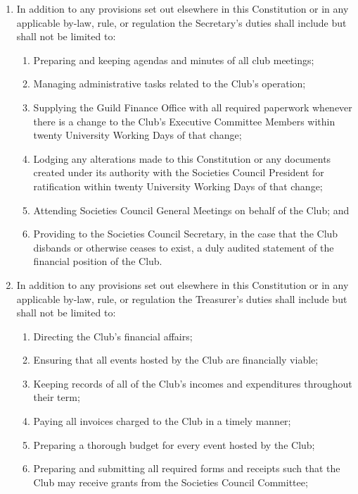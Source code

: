 \documentclass[12pt]{article}
\begin{document}
\begin{enumerate}[label=9.\arabic*]
\begin{enumerate}[label=\theenumi.\arabic*]
    \end{enumerate}
    \item In addition to any provisions set out elsewhere in this Constitution or in any applicable by-law, rule, or regulation the Secretary's duties shall include but shall not be limited to:
    \begin{enumerate}[label=\theenumi.\arabic*]
        \item Preparing and keeping agendas and minutes of all club meetings;
        \item Managing administrative tasks related to the Club's operation;
        \item Supplying the Guild Finance Office with all required paperwork whenever there is a change to the Club's Executive Committee Members within twenty University Working Days of that change;
        \item Lodging any alterations made to this Constitution or any documents created under its authority with the Societies Council President for ratification within twenty University Working Days of that change;
        \item Attending Societies Council General Meetings on behalf of the Club; and
        \item Providing to the Societies Council Secretary, in the case that the Club disbands or otherwise ceases to exist, a duly audited statement of the financial position of the Club.
    \end{enumerate}
\item In addition to any provisions set out elsewhere in this Constitution or in any applicable by-law, rule, or regulation the Treasurer's duties shall include but shall not be limited to:
    \begin{enumerate}[label=\theenumi.\arabic*]
        \item Directing the Club's financial affairs;
        \item Ensuring that all events hosted by the Club are financially viable;
        \item Keeping records of all of the Club's incomes and expenditures throughout their term;
        \item Paying all invoices charged to the Club in a timely manner;
        \item Preparing a thorough budget for every event hosted by the Club;
        \item Preparing and submitting all required forms and receipts such that the Club may receive grants from the Societies Council Committee;

\end{enumerate}
\end{enumerate}
\end{document}
